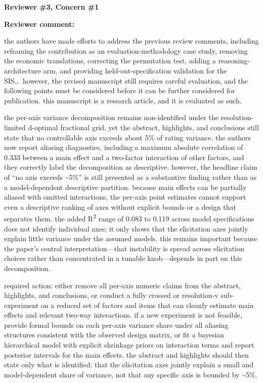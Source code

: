 \documentclass[11pt]{article}
\newcommand{\rvcomment}[1]{{\color{ReviewerGreen}#1}}
\newcommand{\concern}[1]{\textbf{\color{ReviewerGreen}#1}}
\begin{document}
\vspace{4pt}

\concern{Reviewer \#3, Concern \#1}

\concern{Reviewer comment:}

\rvcomment{the authors have made efforts to address the previous review comments, including
reframing the contribution as an evaluation-methodology case study, removing the economic
translations, correcting the permutation test, adding a reasoning-architecture arm, and providing
held-out-specification validation for the SIS\dots\ however, the revised manuscript still requires
careful evaluation, and the following points must be considered before it can be further considered
for publication. this manuscript is a research article, and it is evaluated as such.}

\rvcomment{the per-axis variance decomposition remains non-identified under the
resolution-limited d-optimal fractional grid, yet the abstract, highlights, and conclusions still
state that no controllable axis exceeds about 5\% of rating variance. the authors now report
aliasing diagnostics, including a maximum absolute correlation of 0.333 between a main effect and a
two-factor interaction of other factors, and they correctly label the decomposition as descriptive.
however, the headline claim of ``no axis exceeds \textasciitilde5\%'' is still presented as a
substantive finding rather than as a model-dependent descriptive partition. because main effects can
be partially aliased with omitted interactions, the per-axis point estimates cannot support even a
descriptive ranking of axes without explicit bounds or a design that separates them. the added
R\textsuperscript{2} range of 0.083 to 0.119 across model specifications does not identify individual
axes; it only shows that the elicitation axes jointly explain little variance under the assumed
models. this remains important because the paper's central interpretation---that instability is
spread across elicitation choices rather than concentrated in a tunable knob---depends in part on
this decomposition.}

\rvcomment{required action: either remove all per-axis numeric claims from the abstract, highlights,
and conclusions, or conduct a fully crossed or resolution-v sub-experiment on a reduced set of
factors and items that can cleanly estimate main effects and relevant two-way interactions. if a new
experiment is not feasible, provide formal bounds on each per-axis variance share under all aliasing
structures consistent with the observed design matrix, or fit a bayesian hierarchical model with
explicit shrinkage priors on interaction terms and report posterior intervals for the main effects.
the abstract and highlights should then state only what is identified: that the elicitation axes
jointly explain a small and model-dependent share of variance, not that any specific axis is bounded
by \textasciitilde5\%.}
\end{document}
